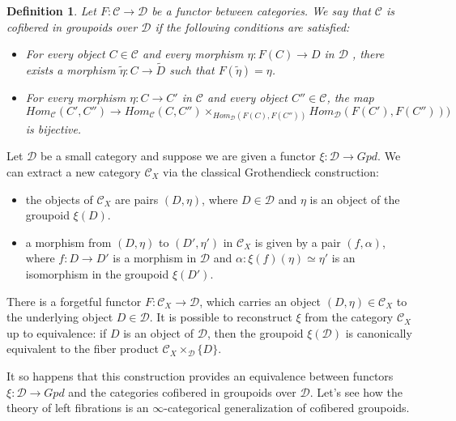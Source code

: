 \documentclass[a4paper, 12pt]{amsart}
\newcommand{\8}{\infty}
\newtheorem{definition}{Definition}
\begin{document}
\begin{definition}
  Let $F:\mathcal{C}\rightarrow \mathcal{D}$ be a functor between categories. We say that $\mathcal{C}$ is cofibered in groupoids over $\mathcal{D}$
  if the following conditions are satisfied:
  \begin{itemize}
    \item[(1)] For every object $C\in\mathcal{C}$ and every morphism $\eta:F(C)\rightarrow D$ in $\mathcal{D}$ , there exists a morphism $\tilde{\eta} : C \rightarrow \tilde{D}$ such that $F(\tilde{\eta}) = \eta$.
    \item[(2)] For every morphism $\eta: C\rightarrow C'$ in $\mathcal{C}$ and every object $C''\in\mathcal{C}$, the map
          $$
            Hom_\mathcal{C}(C',C'')\rightarrow Hom_\mathcal{C}(C,C'')\times_{Hom_\mathcal{D}(F(C),F(C''))}Hom_\mathcal{D}(F(C'),F(C'')))
          $$
          is bijective.
  \end{itemize}
\end{definition}

Let $\mathcal{D}$ be a small category and suppose we are given a functor $\xi:\mathcal{D}\rightarrow Gpd$. We can extract a new category $\mathcal{C}_X$ via the classical Grothendieck construction:

\begin{itemize}
  \item the objects of $\mathcal{C}_X$ are pairs $(D,\eta)$, where $D\in\mathcal{D}$ and $\eta$ is an object of the groupoid $\xi(D)$.
  \item a morphism from $(D,\eta)$ to $(D',\eta')$ in $\mathcal{C}_X$ is given by a pair $(f,\alpha)$, where $f:D\rightarrow D'$ is a morphism in $\mathcal{D}$ and $\alpha:\xi(f)(\eta)\simeq \eta'$ is an isomorphism in the groupoid $\xi(D')$.
\end{itemize}

There is a forgetful functor $F:\mathcal{C}_X \rightarrow\mathcal{D}$, which carries an object $(D,\eta)\in\mathcal{C}_X$ to the underlying object $D\in\mathcal{D}$. It is possible to reconstruct $\xi$ from the category $\mathcal{C}_X$ up to equivalence: if $D$ is an object of $\mathcal{D}$, then the groupoid $\xi(\mathcal{D})$ is canonically equivalent to the fiber product $\mathcal{C}_X\times_\mathcal{D}\{D\}$.

It so happens that this construction provides an equivalence between functors $\xi:\mathcal{D}\rightarrow Gpd$ and the categories cofibered in groupoids over $\mathcal{D}$. Let's see how the theory of left fibrations is an $\8$-categorical generalization of cofibered groupoids.
\end{document}
